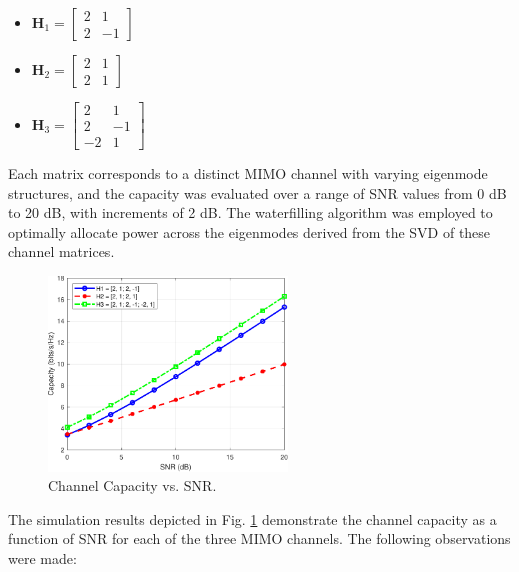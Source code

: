 \documentclass[lettersize,journal]{IEEEtran}
\begin{document}
\begin{itemize}
    \item \( \mathbf{H}_1 = \begin{bmatrix} 2 & 1 \\ 2 & -1 \end{bmatrix} \) \vspace{0.5em}
    \item \( \mathbf{H}_2 = \begin{bmatrix} 2 & 1 \\ 2 & 1 \end{bmatrix} \) \vspace{0.5em}
    \item \( \mathbf{H}_3 = \begin{bmatrix} 2 & 1 \\ 2 & -1 \\ -2 & 1 \end{bmatrix} \)
\end{itemize}

Each matrix corresponds to a distinct MIMO channel with varying eigenmode structures, and the capacity was evaluated over a range of SNR values from 0 dB to 20 dB, with increments of 2 dB. The waterfilling algorithm was employed to optimally allocate power across the eigenmodes derived from the SVD of these channel matrices.

\begin{figure}[!t]
\begin{center}
\includegraphics[width=2.5in]{MIMO_Channel_Capacity_vs_SNR}
\caption{Channel Capacity vs. SNR.}
\label{fig:ChannelCapacityvsSNR}
\end{center}
\end{figure}

The simulation results depicted in Fig. \ref{fig:ChannelCapacityvsSNR} demonstrate the channel capacity as a function of SNR for each of the three MIMO channels. The following observations were made:
\end{document}
